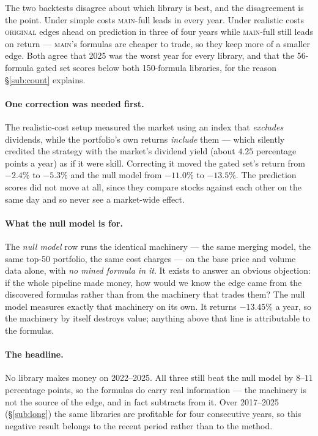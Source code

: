 \documentclass[11pt]{article}
\newcommand{\main}{\textsc{main}}
\newcommand{\orig}{\textsc{original}}
\begin{document}
\noindent The two backtests disagree about which library is best, and the
disagreement is the point. Under simple costs \main{}-full leads in every year. Under
realistic costs \orig{} edges ahead on prediction in three of four years while
\main{}-full still leads on return --- \main{}'s formulas are cheaper to trade, so
they keep more of a smaller edge. Both agree that 2025 was the worst year for every
library, and that the 56-formula gated set scores below both 150-formula libraries,
for the reason \S\ref{sub:count} explains.

\paragraph{One correction was needed first.}
The realistic-cost setup measured the market using an index that \emph{excludes}
dividends, while the portfolio's own returns \emph{include} them --- which silently
credited the strategy with the market's dividend yield (about $4.25$ percentage points
a year) as if it were skill. Correcting it moved the gated set's return from $-2.4\%$
to $-5.3\%$ and the null model from $-11.0\%$ to $-13.5\%$. The prediction scores did
not move at all, since they compare stocks against each other on the same day and so
never see a market-wide effect.

\paragraph{What the null model is for.}
The \emph{null model} row runs the identical machinery --- the same merging model, the
same top-50 portfolio, the same cost charges --- on the base price and volume data
alone, with \emph{no mined formula in it}. It exists to answer an obvious objection:
if the whole pipeline made money, how would we know the edge came from the discovered
formulas rather than from the machinery that trades them? The null model measures
exactly that machinery on its own. It returns $-13.45\%$ a year, so the machinery by
itself destroys value; anything above that line is attributable to the formulas.

\paragraph{The headline.}
No library makes money on 2022--2025. All three still beat the null model by $8$--$11$
percentage points, so the formulas do carry real information --- the machinery is not
the source of the edge, and in fact subtracts from it. Over 2017--2025
(\S\ref{sub:long}) the same libraries are profitable for four consecutive years, so
this negative result belongs to the recent period rather than to the method.
\end{document}
